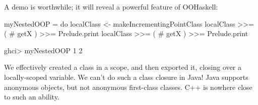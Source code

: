 \noindent
A demo is worthwhile; it will reveal a powerful feature of OOHaskell:

\begin{code}
 myNestedOOP =
   do
      localClass <- makeIncrementingPointClass
      localClass >>= ( # getX ) >>= Prelude.print
      localClass >>= ( # getX ) >>= Prelude.print
\end{code}

\begin{code}
 ghci> myNestedOOP
 1
 2
\end{code}

\noindent
We effectively created a class in a scope, and then exported it,
closing over a locally-scoped variable. We can't do such a class
closure in Java! Java supports anonymous objects, but not anonymous
first-class classes. C++ is nowhere close to such an ability.  





